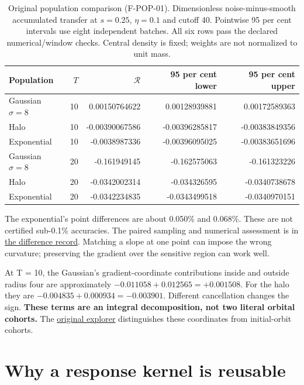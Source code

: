 \documentclass[fleqn,usenatbib]{mnras}
\begin{document}
\begin{table}
\centering
\caption{Original population comparison (F-POP-01). Dimensionless noise-minus-smooth accumulated transfer at $s=0.25$, $\eta=0.1$ and cutoff 40. Pointwise 95 per cent intervals use eight independent batches. All six rows pass the declared numerical/window checks. Central density is fixed; weights are not normalized to unit mass.}\label{tab-pop}
\small
\setlength{\tabcolsep}{4pt}
\begin{tabular}{lrrrr}
\toprule
Population & $T$ & $\mathcal R$ & 95 per cent lower & 95 per cent upper \\
\midrule
Gaussian $\sigma=8$ & 10 & 0.00150764622 & 0.00128939881 & 0.00172589363 \\
Halo & 10 & -0.00390067586 & -0.00396285817 & -0.00383849356 \\
Exponential & 10 & -0.0038987336 & -0.00396095025 & -0.00383651696 \\
Gaussian $\sigma=8$ & 20 & -0.161949145 & -0.162575063 & -0.161323226 \\
Halo & 20 & -0.0342002314 & -0.034326595 & -0.0340738678 \\
Exponential & 20 & -0.0342234835 & -0.0343499518 & -0.0340970151 \\
\bottomrule
\end{tabular}
\end{table}

The exponential's point differences are about 0.050\% and 0.068\%. These are not certified sub-0.1\% accuracies. The paired sampling and numerical assessment is in \href{https://djova.ca/galaxy-bar/diagnostics/population-accuracy/joint-error-assessment.json}{the difference record}. Matching a slope at one point can impose the wrong curvature; preserving the gradient over the sensitive region can work well.

At T = 10, the Gaussian's gradient-coordinate contributions inside and outside radius four are approximately \(-0.011058+0.012565=+0.001508\). For the halo they are \(-0.004835+0.000934=-0.003901\). Different cancellation changes the sign. \textbf{These terms are an integral decomposition, not two literal orbital cohorts.} The \href{https://djova.ca/galaxy-bar/population-response.html}{original explorer} distinguishes these coordinates from initial-orbit cohorts.

\section{Why a response kernel is reusable}\label{kernel}
\end{document}
